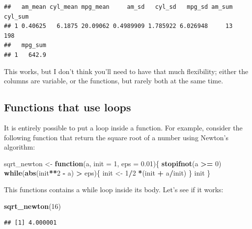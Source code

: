 \documentclass[]{gitbook}
\newenvironment{Shaded}{\begin{snugshade}}{\end{snugshade}}
\newcommand{\ControlFlowTok}[1]{\textcolor[rgb]{0.13,0.29,0.53}{\textbf{#1}}}
\newcommand{\DataTypeTok}[1]{\textcolor[rgb]{0.13,0.29,0.53}{#1}}
\newcommand{\DecValTok}[1]{\textcolor[rgb]{0.00,0.00,0.81}{#1}}
\newcommand{\FloatTok}[1]{\textcolor[rgb]{0.00,0.00,0.81}{#1}}
\newcommand{\KeywordTok}[1]{\textcolor[rgb]{0.13,0.29,0.53}{\textbf{#1}}}
\newcommand{\NormalTok}[1]{#1}
\newcommand{\OperatorTok}[1]{\textcolor[rgb]{0.81,0.36,0.00}{\textbf{#1}}}
\newcommand{\StringTok}[1]{\textcolor[rgb]{0.31,0.60,0.02}{#1}}
\begin{document}
\begin{verbatim}
##   am_mean cyl_mean mpg_mean     am_sd   cyl_sd   mpg_sd am_sum cyl_sum
## 1 0.40625   6.1875 20.09062 0.4989909 1.785922 6.026948     13     198
##   mpg_sum
## 1   642.9
\end{verbatim}

This works, but I don't think you'll need to have that much flexibility; either the columns
are variable, or the functions, but rarely both at the same time.

\hypertarget{functions-that-use-loops}{%
\subsection{Functions that use loops}\label{functions-that-use-loops}}

It is entirely possible to put a loop inside a function. For example, consider the following
function that return the square root of a number using Newton's algorithm:

\begin{Shaded}
\begin{Highlighting}[]
\NormalTok{sqrt_newton <-}\StringTok{ }\ControlFlowTok{function}\NormalTok{(a, }\DataTypeTok{init =} \DecValTok{1}\NormalTok{, }\DataTypeTok{eps =} \FloatTok{0.01}\NormalTok{)\{}
    \KeywordTok{stopifnot}\NormalTok{(a }\OperatorTok{>=}\StringTok{ }\DecValTok{0}\NormalTok{)}
    \ControlFlowTok{while}\NormalTok{(}\KeywordTok{abs}\NormalTok{(init}\OperatorTok{**}\DecValTok{2} \OperatorTok{-}\StringTok{ }\NormalTok{a) }\OperatorTok{>}\StringTok{ }\NormalTok{eps)\{}
\NormalTok{        init <-}\StringTok{ }\DecValTok{1}\OperatorTok{/}\DecValTok{2} \OperatorTok{*}\NormalTok{(init }\OperatorTok{+}\StringTok{ }\NormalTok{a}\OperatorTok{/}\NormalTok{init)}
\NormalTok{    \}}
\NormalTok{    init}
\NormalTok{\}}
\end{Highlighting}
\end{Shaded}

This functions contains a while loop inside its body. Let's see if it works:

\begin{Shaded}
\begin{Highlighting}[]
\KeywordTok{sqrt_newton}\NormalTok{(}\DecValTok{16}\NormalTok{)}
\end{Highlighting}
\end{Shaded}

\begin{verbatim}
## [1] 4.000001
\end{verbatim}
\end{document}
